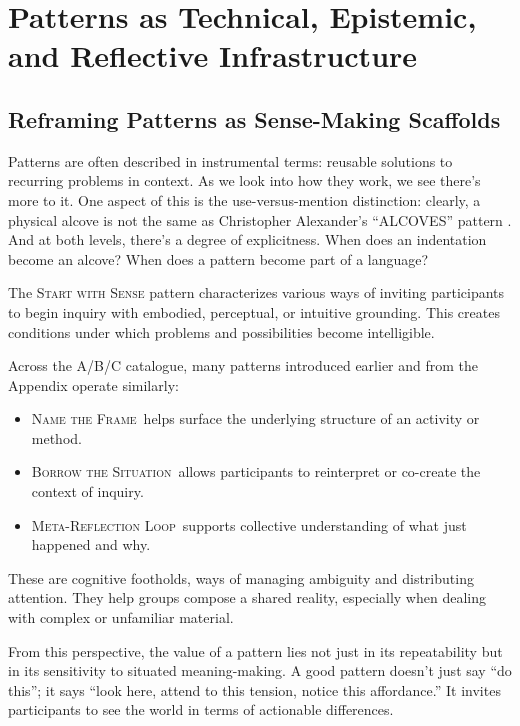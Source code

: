 \documentclass[acmlarge,timestamp]{acmart}
\providecommand{\tightlist}{%
  \setlength{\itemsep}{0pt}\setlength{\parskip}{0pt}}
\begin{document}
\medskip

\section{Patterns as Technical, Epistemic, and Reflective Infrastructure}\label{sec:III}

\subsection{Reframing Patterns as Sense-Making Scaffolds}

Patterns are often described in instrumental terms: reusable solutions
to recurring problems in context.  As we look into how they work, we
see there’s more to it.  One aspect of this is the use-versus-mention
distinction: clearly, a physical alcove is not the same as Christopher
Alexander's “ALCOVES” pattern \cite{alexander1977a}.  And at both
levels, there’s a degree of explicitness.  When does an indentation
become an alcove?  When does a pattern become part of a language?

The {\scshape{Start with Sense}} pattern characterizes various ways of
inviting participants to begin inquiry with embodied, perceptual, or
intuitive grounding. This creates conditions under which problems and
possibilities become intelligible.

Across the A/B/C catalogue, many patterns introduced earlier and from
the Appendix operate similarly:

\begin{itemize}
\tightlist
\item[]
  {\scshape{Name the Frame}}~helps surface the underlying structure of an activity or method.
\item[]
  {\scshape{Borrow the Situation}}~allows participants to reinterpret or co-create the context of inquiry.
\item[]
  {\scshape{Meta-Reflection Loop}}~supports collective understanding of what just happened and why.
\end{itemize}

These are cognitive footholds, ways of managing ambiguity and
distributing attention. They help groups compose a shared reality,
especially when dealing with complex or unfamiliar material.

From this perspective, the value of a pattern lies not just in its
repeatability but in its sensitivity to situated meaning-making. A
good pattern doesn't just say ``do this''; it says ``look here, attend
to this tension, notice this affordance.'' It invites participants to
see the world in terms of actionable differences.
\end{document}
